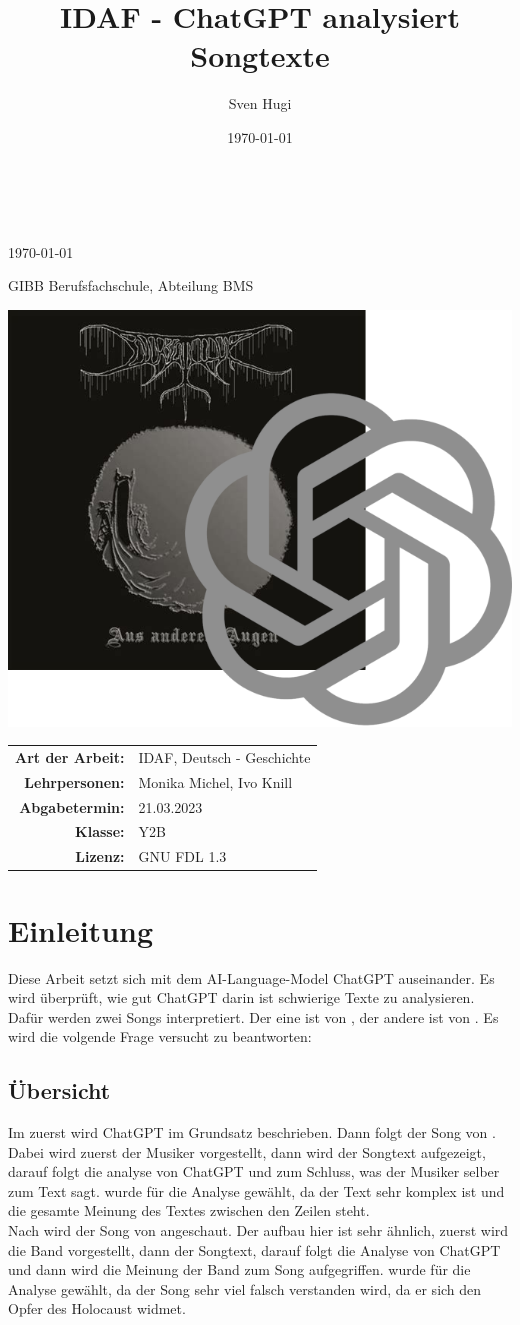 \documentclass[twocolumn,10pt]{article}
\author{Sven Hugi}
\title{IDAF - ChatGPT analysiert Songtexte}
\date{\today}
\makeatletter
\renewcommand{\maketitle}{
	\begin{center}

		\vspace*{.125\textheight}
		{\Huge \textbf{\@title}\\}
		{\LARGE \textbf{\@author}\\}
		{\large \today\\}
		{\Large GIBB Berufsfachschule, Abteilung BMS\par\vspace*{1cm}}
		\includegraphics[width=\linewidth]{title.png}
		\vfill
		\begin{center}
			\begin{tabularx}{.4\linewidth}{rl}
				\textbf{Art der Arbeit:}				& IDAF, Deutsch - Geschichte\\
				\textbf{Lehrpersonen:}					& Monika Michel, Ivo Knill\\
				\textbf{Abgabetermin:}					& 21.03.2023\\
				\textbf{Klasse:}						& Y2B	\\
				\textbf{Lizenz:}						&
				GNU FDL 1.3
			\end{tabularx}
		\end{center}
		
	\end{center}
}
\makeatother
\begin{document}
	\begin{titlepage}
		\maketitle
		\thispagestyle{empty}
	\end{titlepage}
	\onecolumn
	\pagestyle{fancy}
	\tableofcontents
	\clearpage
	\twocolumn
	
	\section{Einleitung}
		Diese Arbeit setzt sich mit dem AI-Language-Model ChatGPT\cite{ChatGPT} auseinander. Es wird überprüft, wie gut ChatGPT darin ist schwierige Texte zu analysieren. Dafür werden zwei Songs interpretiert. Der eine ist  von , der andere ist  von . Es wird die volgende Frage versucht zu beantworten:\\
		\textbf{}
		\subsection{Übersicht}
		Im zuerst wird ChatGPT\cite{ChatGPT} im Grundsatz beschrieben. Dann folgt der Song  von . Dabei wird zuerst der Musiker vorgestellt, dann wird der Songtext aufgezeigt, darauf folgt die analyse von ChatGPT und zum Schluss, was der Musiker selber zum Text sagt.  wurde für die Analyse gewählt, da der Text sehr komplex ist und die gesamte Meinung des Textes zwischen den Zeilen steht.\\
		Nach  wird der Song  von  angeschaut. Der aufbau hier ist sehr ähnlich, zuerst wird die Band vorgestellt, dann der Songtext, darauf folgt die Analyse von ChatGPT und dann wird die Meinung der Band zum Song aufgegriffen.  wurde für die Analyse gewählt, da der Song sehr viel falsch verstanden wird, da er sich den Opfer des Holocaust widmet.
\end{document}
